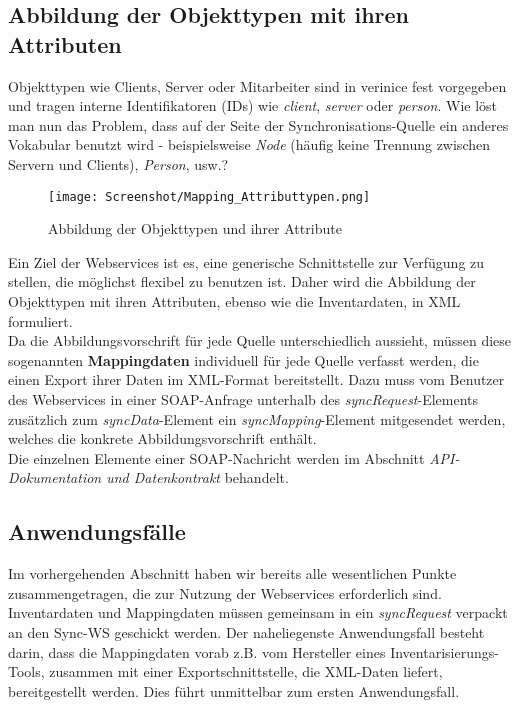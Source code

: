 \documentclass[a4paper,10pt]{book}
\begin{document}
\subsection{Abbildung der Objekttypen mit ihren Attributen}
Objekttypen wie Clients, Server oder Mitarbeiter sind in verinice fest vorgegeben und tragen interne
Identifikatoren (IDs) wie \textit{client}, \textit{server} oder \textit{person}. Wie löst man nun das Problem,
dass auf der Seite der Synchronisations-Quelle ein anderes Vokabular benutzt wird - beispielsweise \textit{Node}
(häufig keine Trennung zwischen Servern und Clients), \textit{Person}, usw.?
\newline
\begin{figure}[htb!]
  \centering
  \texttt{[image: Screenshot/Mapping\_Attributtypen.png]}
  \caption{\label{Abbildung der Objekttypen und ihrer Attribute} Abbildung der Objekttypen und ihrer Attribute}
\end{figure}
\newline
Ein Ziel der Webservices ist es, eine generische Schnittstelle zur Verfügung zu stellen, die möglichst
flexibel zu benutzen ist. Daher wird die Abbildung der Objekttypen mit ihren Attributen, ebenso
wie die Inventardaten, in XML formuliert.
\newline\\
Da die Abbildungsvorschrift für jede Quelle unterschiedlich aussieht, müssen diese sogenannten
\textbf{Mappingdaten} individuell für jede Quelle verfasst werden, die einen Export ihrer Daten im XML-Format
bereitstellt. Dazu muss vom Benutzer des Webservices in einer SOAP-Anfrage unterhalb des \textit{syncRequest}-Elements zusätzlich
zum \textit{syncData}-Element ein \textit{syncMapping}-Element mitgesendet werden, welches die konkrete Abbildungsvorschrift enthält.
\newline\\
Die einzelnen Elemente einer SOAP-Nachricht werden im Abschnitt \textit{API-Dokumentation und Datenkontrakt} behandelt.

\subsection{Anwendungsfälle}
Im vorhergehenden Abschnitt haben wir bereits alle wesentlichen Punkte zusammengetragen, die zur Nutzung der
Webservices erforderlich sind. Inventardaten und Mappingdaten müssen gemeinsam in ein \textit{syncRequest}
verpackt an den Sync-WS geschickt werden. Der naheliegenste Anwendungsfall besteht darin, dass die
Mappingdaten vorab z.B. vom Hersteller eines Inventarisierungs-Tools, zusammen mit einer Exportschnittstelle, die
XML-Daten liefert, bereitgestellt werden. Dies führt unmittelbar zum ersten Anwendungsfall.
\end{document}
